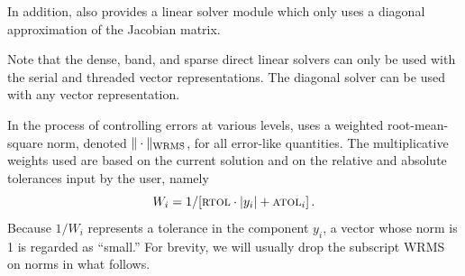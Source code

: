 In addition, {\cvode} also provides a linear solver module which only uses
a diagonal approximation of the Jacobian matrix.

Note that the dense, band, and sparse direct linear solvers can only be
used with the serial and threaded vector representations.  The
diagonal solver can be used with any vector representation.

In the process of controlling errors at various levels, {\cvodes} uses a
weighted root-mean-square norm, denoted $\|\cdot\|_{\mbox{\scriptsize WRMS}}$,
for all error-like quantities.  The multiplicative weights used are
based on the current solution and on the relative and absolute
tolerances input by the user, namely
\begin{equation}\label{e:errwt}
 W_i = 1 / [\mbox{\sc rtol} \cdot |y_i| + \mbox{\sc atol}_i ] \, .
\end{equation}
Because $1/W_i$ represents a tolerance in the component $y_i$, a vector
whose norm is 1 is regarded as ``small.''  For brevity, we will
usually drop the subscript WRMS on norms in what follows.

